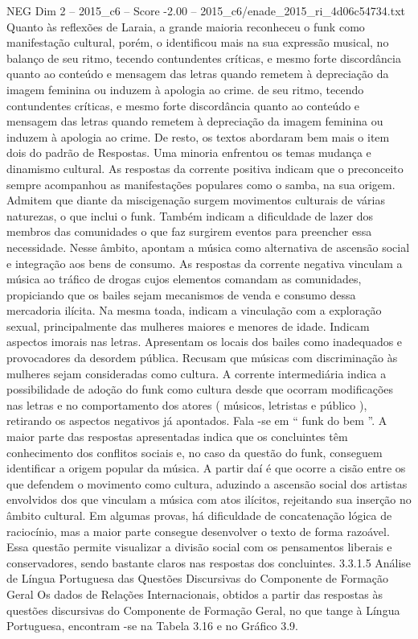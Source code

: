 \begin{textsample}{NEG Dim 2 – 2015\_c6 – Score -2.00 – 2015\_c6/enade\_2015\_ri\_4d06c54734.txt}
Quanto às reflexões de Laraia, a grande maioria reconheceu o funk como manifestação cultural, porém, o identificou mais na sua expressão musical, no balanço de seu ritmo, tecendo contundentes críticas, e mesmo forte discordância quanto ao conteúdo e mensagem das letras quando remetem à depreciação da imagem feminina ou induzem à apologia ao crime. de seu ritmo, tecendo contundentes críticas, e mesmo forte discordância quanto ao conteúdo e mensagem das letras quando remetem à depreciação da imagem feminina ou induzem à apologia ao crime.
De resto, os textos abordaram bem mais o item dois do padrão de Respostas.
Uma minoria enfrentou os temas mudança e dinamismo cultural.
As respostas da corrente positiva indicam que o preconceito sempre acompanhou as manifestações populares como o samba, na sua origem.
Admitem que diante da miscigenação surgem movimentos culturais de várias naturezas, o que inclui o funk.
Também indicam a dificuldade de lazer dos membros das comunidades o que faz surgirem eventos para preencher essa necessidade.
Nesse âmbito, apontam a música como alternativa de ascensão social e integração aos bens de consumo.
As respostas da corrente negativa vinculam a música ao tráfico de drogas cujos elementos comandam as comunidades, propiciando que os bailes sejam mecanismos de venda e consumo dessa mercadoria ilícita.
Na mesma toada, indicam a vinculação com a exploração sexual, principalmente das mulheres maiores e menores de idade.
Indicam aspectos imorais nas letras.
Apresentam os locais dos bailes como inadequados e provocadores da desordem pública.
Recusam que músicas com discriminação às mulheres sejam consideradas como cultura.
A corrente intermediária indica a possibilidade de adoção do funk como cultura desde que ocorram modificações nas letras e no comportamento dos atores ( músicos, letristas e público ), retirando os aspectos negativos já apontados.
Fala -se em “ funk do bem ”.
A maior parte das respostas apresentadas indica que os concluintes têm conhecimento dos conflitos sociais e, no caso da questão do funk, conseguem identificar a origem popular da música.
A partir daí é que ocorre a cisão entre os que defendem o movimento como cultura, aduzindo a ascensão social dos artistas envolvidos dos que vinculam a música com atos ilícitos, rejeitando sua inserção no âmbito cultural.
Em algumas provas, há dificuldade de concatenação lógica de raciocínio, mas a maior parte consegue desenvolver o texto de forma razoável.
Essa questão permite visualizar a divisão social com os pensamentos liberais e conservadores, sendo bastante claros nas respostas dos concluintes. 3.3.1.5 Análise de Língua Portuguesa das Questões Discursivas do Componente de Formação Geral Os dados de Relações Internacionais, obtidos a partir das respostas às questões discursivas do Componente de Formação Geral, no que tange à Língua Portuguesa, encontram -se na Tabela 3.16 e no Gráfico 3.9.

\end{textsample}
